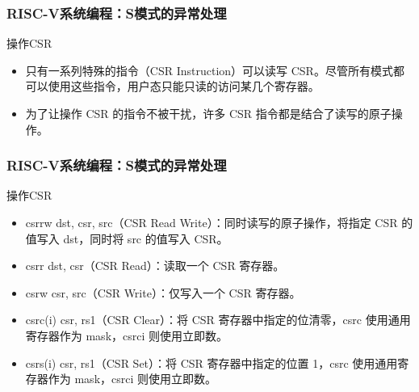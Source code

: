 
\begin{frame}
    \frametitle{RISC-V系统编程：S模式的异常处理}
    
    操作CSR
    \begin{itemize}
        \item 只有一系列特殊的指令（CSR Instruction）可以读写 CSR。尽管所有模式都可以使用这些指令，用户态只能只读的访问某几个寄存器。
        \item 为了让操作 CSR 的指令不被干扰，许多 CSR 指令都是结合了读写的原子操作。

        
    \end{itemize}
\end{frame}


\begin{frame}
    \frametitle{RISC-V系统编程：S模式的异常处理}
    
    操作CSR
    \begin{itemize}
        \item csrrw dst, csr, src（CSR Read Write）：同时读写的原子操作，将指定 CSR 的值写入 dst，同时将 src 的值写入 CSR。
        \item csrr dst, csr（CSR Read）：读取一个 CSR 寄存器。
        \item csrw csr, src（CSR Write）：仅写入一个 CSR 寄存器。
        \item csrc(i) csr, rs1（CSR Clear）：将 CSR 寄存器中指定的位清零，csrc 使用通用寄存器作为 mask，csrci 则使用立即数。
        \item csrs(i) csr, rs1（CSR Set）：将 CSR 寄存器中指定的位置 1，csrc 使用通用寄存器作为 mask，csrci 则使用立即数。
    \end{itemize}
\end{frame}


